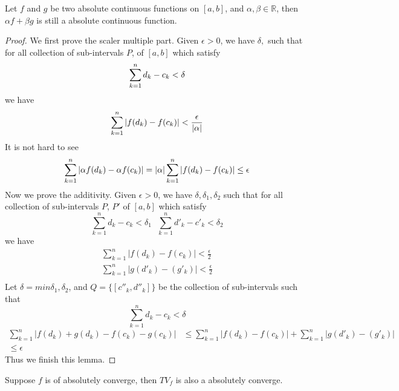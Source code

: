 \documentclass[lang=en, 12pt]{elegantbook}
\newcommand{\RR}{\mathbb{R}}
\begin{document}
            \begin{lemma}
                Let $f$ and $g$ be two absolute continuous functions on $[a,b]$, and $\alpha, \beta \in \RR$, then  
            $\alpha f + \beta g$ is still a absolute continuous function.
            \end{lemma}
            \begin{proof}
                We first prove the scaler multiple part. Given $\epsilon> 0$, we have $\delta,$ such that for all collection of sub-intervals $P$, 
            of $[a,b]$ which satisfy
            $$\sum_{k=1}^n d_k -c_k < \delta \\$$
            we have 
            $$\sum_{k=1}^n |f(d_k) -f(c_k)| <\frac{\epsilon}{|\alpha|} \\$$
            It is not hard to see 
            $$\sum_{k=1}^n |\alpha f(d_k) - \alpha f(c_k)| = |\alpha| \sum_{k=1}^n |f(d_k) -f(c_k)| \leq \epsilon \\$$
                Now we prove the additivity. Given $\epsilon> 0$, we have $\delta, \delta_1, \delta_2$ such that for all collection of sub-intervals $P$, $P'$ of $[a,b]$ which satisfy
            $$\sum_{k=1}^n d_k -c_k <\delta_1 \ \ \ \sum_{k=1}^n d'_k -c'_k <\delta_2$$
            we have 
            \begin{equation*}
                \begin{aligned} 
                    \sum_{k=1}^n |f(d_k) -f(c_k)| <\frac{\epsilon}{2} \\ 
                    \sum_{k=1}^n |g(d'_k) -(g'_k)| <\frac{\epsilon}{2}    \\
                \end{aligned}
            \end{equation*}
            Let $\delta = min{\delta_1, \delta_2}$, and $Q = \{[c''_k, d''_k]\}$ be the collection of sub-intervals such that 
            $$\sum_{k=1}^n d_k -c_k < \delta$$
            \begin{equation*}
                \begin{aligned}
                    \sum_{k=1}^n |f(d_k) + g(d_k) -f(c_k) -g(c_k)| &\leq  \sum_{k=1}^n |f(d_k) -f(c_k)| + \sum_{k=1}^n |g(d'_k) -(g'_k)|\\
                    \leq \epsilon
                \end{aligned}
            \end{equation*}
            Thus we finish this lemma.
            \end{proof}
            \begin{lemma}
                Suppose $f$ is of absolutely converge, then $TV_f$ is also a absolutely converge.
            \end{lemma}
\end{document}
